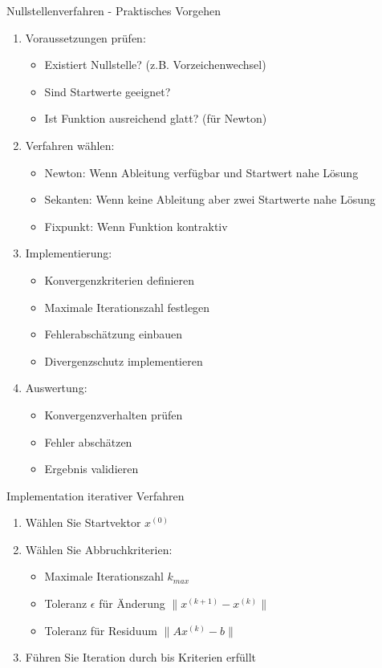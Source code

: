 \begin{KR}{Nullstellenverfahren - Praktisches Vorgehen}
\begin{enumerate}
    \item Voraussetzungen prüfen:
    \begin{itemize}
        \item Existiert Nullstelle? (z.B. Vorzeichenwechsel)
        \item Sind Startwerte geeignet?
        \item Ist Funktion ausreichend glatt? (für Newton)
    \end{itemize}
    
    \item Verfahren wählen:
    \begin{itemize}
        \item Newton: Wenn Ableitung verfügbar und Startwert nahe Lösung
        \item Sekanten: Wenn keine Ableitung aber zwei Startwerte nahe Lösung
        \item Fixpunkt: Wenn Funktion kontraktiv
    \end{itemize}
    
    \item Implementierung:
    \begin{itemize}
        \item Konvergenzkriterien definieren
        \item Maximale Iterationszahl festlegen
        \item Fehlerabschätzung einbauen
        \item Divergenzschutz implementieren
    \end{itemize}
    
    \item Auswertung:
    \begin{itemize}
        \item Konvergenzverhalten prüfen
        \item Fehler abschätzen
        \item Ergebnis validieren
    \end{itemize}
\end{enumerate}
\end{KR}

\begin{KR}{Implementation iterativer Verfahren}
\begin{enumerate}
    \item Wählen Sie Startvektor $x^{(0)}$
    \item Wählen Sie Abbruchkriterien:
        \begin{itemize}
            \item Maximale Iterationszahl $k_{max}$
            \item Toleranz $\epsilon$ für Änderung $\|x^{(k+1)} - x^{(k)}\|$
            \item Toleranz für Residuum $\|Ax^{(k)} - b\|$
        \end{itemize}
    \item Führen Sie Iteration durch bis Kriterien erfüllt
\end{enumerate}
\end{KR}

